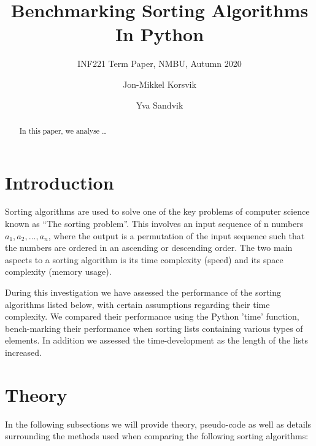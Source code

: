 \documentclass[sigconf, nonacm, natbib, screen, balance=False]{acmart}
\begin{document}
\title{Benchmarking Sorting Algorithms In Python}
\subtitle{INF221 Term Paper, NMBU, Autumn 2020}

\author{Jon-Mikkel Korsvik}
\affiliation{}  %

\author{Yva Sandvik}

\begin{abstract}
  In this paper, we analyse \dots 
\end{abstract}

\maketitle

\section{Introduction}\label{sec:intro}

Sorting algorithms are used to solve one of the key problems of computer science known as “The sorting problem”. This involves an input sequence of n numbers $a_1, a_2, … , a_n$, where the output is a permutation of the input sequence such that the numbers are ordered in an ascending or descending order. The two main aspects to a sorting algorithm is its time complexity (speed) and its space complexity (memory usage).

During this investigation we have assessed the performance of the sorting algorithms listed below, with certain assumptions regarding their time complexity. We compared their performance using the Python 'time' function, bench-marking their performance when sorting lists containing various types of elements. In addition we assessed the time-development as the length of the lists increased. 

\section{Theory}\label{sec:theory}

In the following subsections we will provide theory, pseudo-code as well as details surrounding the methods used when comparing the following sorting algorithms: 
\end{document}
